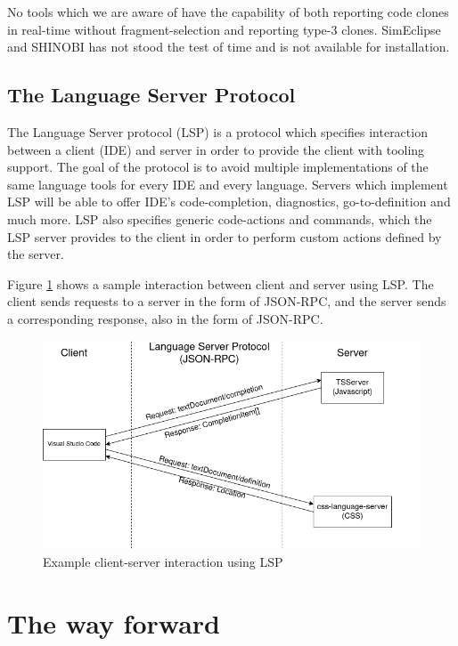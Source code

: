\documentclass[12pt]{article}
\begin{document}
No tools which we are aware of have the capability of both reporting code clones in
real-time without fragment-selection and reporting type-3 clones. SimEclipse and SHINOBI
has not stood the test of time and is not available for installation.

\subsection{The Language Server Protocol}

The Language Server protocol (LSP) is a protocol which specifies interaction between a
client (IDE) and server in order to provide the client with tooling support. The goal of
the protocol is to avoid multiple implementations of the same language tools for every
IDE and every language. Servers which implement LSP will be able to offer IDE's
code-completion, diagnostics, go-to-definition and much more. LSP also specifies generic
code-actions and commands, which the LSP server provides to the client in order to perform
custom actions defined by the server.

Figure \ref{fig:lspcommunication} shows a sample interaction between client and server
using LSP. The client sends requests to a server in the form of JSON-RPC, and the server
sends a corresponding response, also in the form of JSON-RPC.

\begin{figure}
	\includegraphics[width=\textwidth]{images/lspcommunication.png}
	\caption{Example client-server interaction using LSP}
	\label{fig:lspcommunication}
\end{figure}


\section{The way forward}
\end{document}
